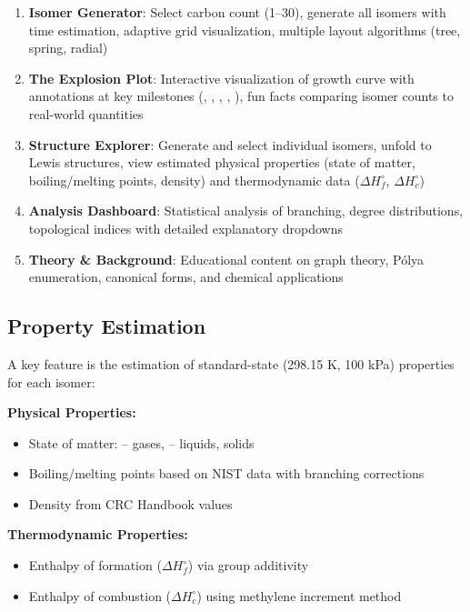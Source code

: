 \documentclass[conference]{IEEEtran}
\begin{document}
\begin{enumerate}
    \item \textbf{Isomer Generator}: Select carbon count (1--30), generate all isomers with time estimation, adaptive grid visualization, multiple layout algorithms (tree, spring, radial)
    
    \item \textbf{The Explosion Plot}: Interactive visualization of growth curve with annotations at key milestones (, , , , ), fun facts comparing isomer counts to real-world quantities
    
    \item \textbf{Structure Explorer}: Generate and select individual isomers, unfold to Lewis structures, view estimated physical properties (state of matter, boiling/melting points, density) and thermodynamic data ($\Delta H_f^\circ$, $\Delta H_c^\circ$)
    
    \item \textbf{Analysis Dashboard}: Statistical analysis of branching, degree distributions, topological indices with detailed explanatory dropdowns
    
    \item \textbf{Theory \& Background}: Educational content on graph theory, Pólya enumeration, canonical forms, and chemical applications
\end{enumerate}

\subsection{Property Estimation}

A key feature is the estimation of standard-state (298.15 K, 100 kPa) properties for each isomer:

\textbf{Physical Properties:}
\begin{itemize}
    \item State of matter: -- gases, -- liquids,  solids
    \item Boiling/melting points based on NIST data with branching corrections
    \item Density from CRC Handbook values
\end{itemize}

\textbf{Thermodynamic Properties:}
\begin{itemize}
    \item Enthalpy of formation ($\Delta H_f^\circ$) via group additivity
    \item Enthalpy of combustion ($\Delta H_c^\circ$) using methylene increment method
\end{itemize}
\end{document}
